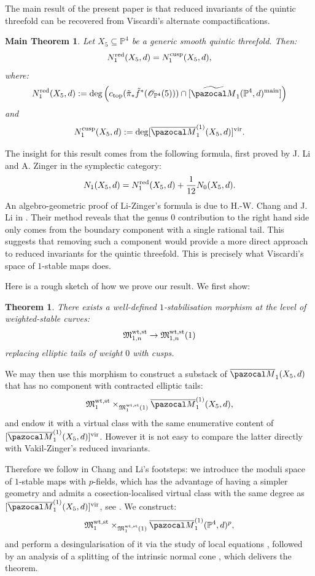 \documentclass[11pt]{amsart}
\newcommand{\Mone}[3]{\overline{\pazocal M}^{(1)}_{#1}(#2,#3)}
\newcommand{\PP}{\mathbb P}
\renewcommand{\to}{\rightarrow}
\newcommand{\MM}{\mathfrak M}
\newcommand{\oM}{\overline{\pazocal M}}
\newcommand{\vir}[1]{[#1]^{\rm{vir}}}
\theoremstyle{plain}
\newtheorem*{teo*}{Theorem}
\newtheorem*{matteo*}{Main Theorem}
\theoremstyle{definition}
\begin{document}
The main result of the present paper is that reduced invariants of the quintic threefold can be recovered from Viscardi's alternate compactifications.

\begin{matteo*}\label{thm:main}
Let $X_5\subseteq\PP^4$ be a generic smooth quintic threefold. Then:
\[
N_1^{\rm{red}}(X_5,d)=N_1^{\rm{cusp}}(X_5,d),
\]
where:
\[N_1^{\rm{red}}(X_5,d):=\deg \left(c_{\rm{top}}(\tilde\pi_*\tilde f^*(\mathcal O_{\PP^4}(5)))\cap [\widetilde{\pazocal M}_{1}(\PP^4,d)^{\rm{main}}]\right)\]
and
\[N_1^{\rm{cusp}}(X_5,d):=\deg [\Mone{1}{X_5}{d}]^{\rm{vir}}.
\]
\end{matteo*}
The insight for this result comes from the following formula, first proved by J. Li and A. Zinger \cite{LZ} in the symplectic category:
\begin{equation*}
N_1(X_5,d)=N_1^{\rm{red}}(X_5,d)+\frac{1}{12}N_0(X_5,d).
\end{equation*}
An algebro-geometric proof of Li-Zinger's formula is due to H.-W. Chang and J. Li in \cite{CL}. Their method reveals that the genus $0$ contribution to the right hand side only comes from the boundary component with a single rational tail. This suggests that removing such a component would provide a more direct approach to reduced invariants for the quintic threefold. This is precisely what Viscardi's space of $1$-stable maps does.

Here is a rough sketch of how we prove our result. We first show:
\begin{teo*}
There exists a well-defined $1$-stabilisation morphism at the level of weighted-stable curves:
\[
\MM_{1,n}^{\rm{wt,st}}\to \MM_{1,n}^{\rm{wt,st}}(1)
\]replacing elliptic tails of weight $0$ with cusps.
\end{teo*}
We may then use this morphism to construct a substack of $\oM_1(X_5,d)$ that has no component with contracted elliptic tails:
\[\MM_{1}^{\rm{wt,st}}\times_{\MM_{1}^{\rm{wt,st}}(1)}\Mone{1}{X_5}{d},\]
and endow it with a virtual class with the same enumerative content of $\vir{\Mone{1}{X_5}{d}}$. However it is not easy to compare the latter directly with Vakil-Zinger's reduced invariants.

Therefore we follow in Chang and Li's footsteps: we introduce the moduli space of $1$-stable maps with $p$-fields, which has the advantage of having a simpler geometry and admits a cosection-localised virtual class with the same degree as $\vir{\Mone{1}{X_5}{d}}$, see \cite{CLpfields}. We construct:
\[\MM_{1}^{\rm{wt,st}}\times_{\MM_{1}^{\rm{wt,st}}(1)}\Mone{1}{\PP^4}{d}^p,\]
and perform a desingularisation of it via the study of local equations \cite{HL}, followed by an analysis of a splitting of the intrinsic normal cone \cite{CL}, which delivers the theorem.
\end{document}
